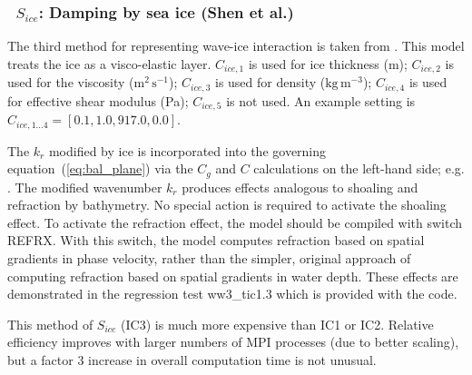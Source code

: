\vsssub
\subsubsection{~$S_{ice}$: Damping by sea ice (Shen et al.)} \label{sec:ICE3}
\vsssub


\noindent
The third method for representing wave-ice interaction is taken from\linebreak
\cite{art:WS10}. This model treats the ice as a visco-elastic
layer. ${C_{ice,1}}$ is used for ice thickness (m); ${C_{ice,2}}$ is used for
the viscosity ($\mathrm{m^2\,s^{-1}}$); ${C_{ice,3}}$ is used for density
($\mathrm{kg\,m^{-3}}$); ${C_{ice,4}}$ is used for effective shear modulus
(Pa); ${C_{ice,5}}$ is not used. An example setting is 
${C_{ice,1...4}}=[0.1, 1.0, 917.0, 0.0]$.

The ${k_r}$ modified by ice is incorporated into the governing
equation~(\ref{eq:bal_plane}) via the $C_g$ and $C$ calculations on the
left-hand side; e.g. \citet[][and subsequent unpublished work]{art:RH09}.  The
modified wavenumber ${k_r}$ produces effects analogous to shoaling and
refraction by bathymetry. No special action is required to activate the
shoaling effect. To activate the refraction effect, the model should be
compiled with switch {\code REFRX}. With this switch, the model computes
refraction based on spatial gradients in phase velocity, rather than the
simpler, original approach of computing refraction based on spatial gradients
in water depth. These effects are demonstrated in the regression test {\file
ww3\_tic1.3} which is provided with the code.

This method of $S_{ice}$ ({\code IC3}) is much more expensive than
 {\code IC1} or {\code IC2}.  Relative efficiency improves with larger 
numbers of MPI processes (due to  better scaling), but a factor 3 increase 
in overall computation time is not unusual. 
